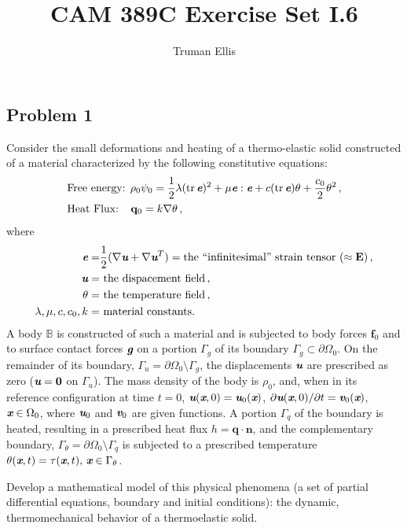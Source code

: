 \documentclass[letterpaper,10pt]{article}
\title{CAM 389C Exercise Set I.6}
\author{Truman Ellis}
\DeclareMathOperator*{\tr}{tr}
\def\mathbi#1{\textbf{\em #1}}
\begin{document}
\maketitle

\subsection*{Problem 1}
Consider the small deformations and heating of a thermo-elastic solid
constructed of a material characterized by the following constitutive equations:
\begin{align*}
&\text{Free energy: }
\rho_0\psi_0=\frac{1}{2}\lambda(\tr\mathbi{e})^2+\mu\mathbi{e}:\mathbi{e}
+c(\tr\mathbi{e})\theta+\frac{c_0}{2}\theta^2\,,\\
&\text{Heat Flux: }\,\,\,\,
\mathbf{q}_0=k\nabla\theta\,,
\end{align*}
where
\begin{align*}
\mathbi{e}=&\frac{1}{2}(\nabla\mathbi{u}+\nabla\mathbi{u}^T)=\text{the
``infinitesimal'' strain tensor } (\approx\mathbf{E})\,,\\
\mathbi{u}=&\text{ the dispacement field}\,,\\
\theta=&\text{ the temperature field}\,,\\
\lambda,\mu,c,c_0,k=&\text{ material constants.}
\end{align*}
A body $\mathbb{B}$ is constructed of such a material and is subjected to body
forces $\mathbf{f}_0$ and to surface contact forces $\mathbi{g}$ on a portion
$\Gamma_g$ of its boundary $\Gamma_g\subset\partial\Omega_0$. On the remainder
of its boundary, $\Gamma_u=\partial\Omega_0\setminus\Gamma_g$, the
displacements $\mathbi{u}$ are prescribed as zero ($\mathbi{u}=\mathbf{0}$ on
$\Gamma_u$). The mass density of the body is $\rho_0$, and, when in its
reference configuration at time $t=0$,
$\mathbi{u}(\mathbi{x},0)=\mathbi{u}_0(\mathbi{x})$,
$\partial\mathbi{u}(\mathbi{x},0)/\partial t=\mathbi{v}_0(\mathbi{x})$, 
$\mathbi{x}\in\Omega_0$, where $\mathbi{u}_0$ and $\mathbi{v}_0$ are given
functions. A portion $\Gamma_q$ of the boundary is heated, resulting in a
prescribed heat flux $h=\mathbf{q}\cdot\mathbf{n}$, and the complementary
boundary, $\Gamma_\theta=\partial\Omega_0\setminus\Gamma_q$ is subjected to a
prescribed temperature
$\theta(\mathbi{x},t)=\tau(\mathbi{x},t),\,\mathbi{x}\in\Gamma_\theta$.

Develop a mathematical model of this physical phenomena (a set of partial
differential equations, boundary and initial conditions): the dynamic,
thermomechanical behavior of a thermoelastic solid.
\end{document}
